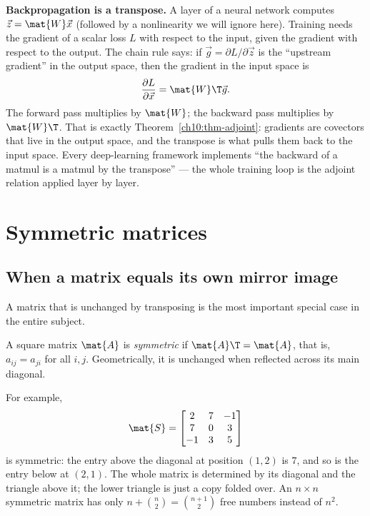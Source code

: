 \begin{applicationbox}
\textbf{Backpropagation is a transpose.} A layer of a neural network computes
$\vec{z}=\mat{W}\vec{x}$ (followed by a nonlinearity we will ignore here). Training needs the
gradient of a scalar loss $L$ with respect to the input, given the gradient with respect to the
output. The chain rule says: if $\vec{g}=\partial L/\partial \vec{z}$ is the ``upstream gradient'' in
the output space, then the gradient in the input space is
\[
  \frac{\partial L}{\partial \vec{x}} = \mat{W}\T \vec{g}.
\]
The forward pass multiplies by $\mat{W}$; the backward pass multiplies by $\mat{W}\T$. That is
exactly Theorem~\ref{ch10:thm-adjoint}: gradients are covectors that live in the output space, and
the transpose is what pulls them back to the input space. Every deep-learning framework implements
``the backward of a matmul is a matmul by the transpose'' --- the whole training loop is the adjoint
relation applied layer by layer.
\end{applicationbox}

\section{Symmetric matrices}

\subsection{When a matrix equals its own mirror image}

A matrix that is unchanged by transposing is the most important special case in the entire subject.

\begin{definition}\label{ch10:def-symmetric}
A square matrix $\mat{A}$ is \emph{symmetric} if $\mat{A}\T=\mat{A}$, that is, $a_{ij}=a_{ji}$ for all
$i,j$. Geometrically, it is unchanged when reflected across its main diagonal.
\end{definition}

For example,
\[
  \mat{S}=\begin{bmatrix} 2 & 7 & -1 \\ 7 & 0 & 3 \\ -1 & 3 & 5 \end{bmatrix}
\]
is symmetric: the entry above the diagonal at position $(1,2)$ is $7$, and so is the entry below at
$(2,1)$. The whole matrix is determined by its diagonal and the triangle above it; the lower triangle
is just a copy folded over. An $n\times n$ symmetric matrix has only $n + \binom{n}{2}=\binom{n+1}{2}$
free numbers instead of $n^2$.

